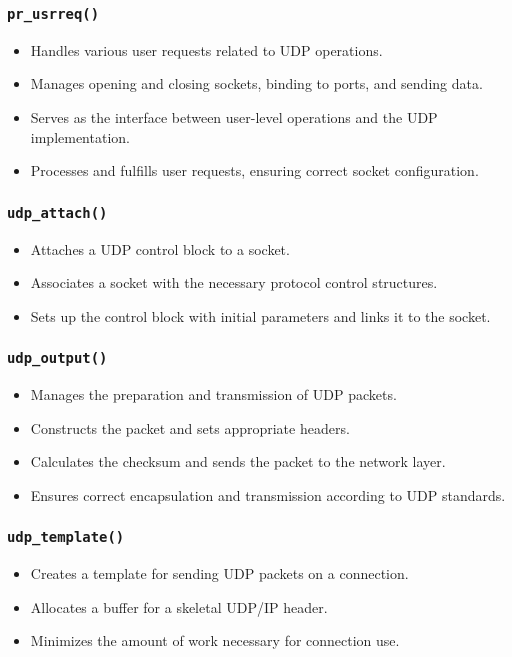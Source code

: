 \subsubsection{\texttt{\large pr\_usrreq()}}
\begin{itemize}
    \item Handles various user requests related to UDP operations.
    \item Manages opening and closing sockets, binding to ports, and sending data.
    \item Serves as the interface between user-level operations and the UDP implementation.
    \item Processes and fulfills user requests, ensuring correct socket configuration.
\end{itemize}

\subsubsection{\texttt{\large udp\_attach()}}
\begin{itemize}
    \item Attaches a UDP control block to a socket.
    \item Associates a socket with the necessary protocol control structures.
    \item Sets up the control block with initial parameters and links it to the socket.
\end{itemize}

\subsubsection{\texttt{\large udp\_output()}}
\begin{itemize}
    \item Manages the preparation and transmission of UDP packets.
    \item Constructs the packet and sets appropriate headers.
    \item Calculates the checksum and sends the packet to the network layer.
    \item Ensures correct encapsulation and transmission according to UDP standards.
\end{itemize}

\subsubsection{\texttt{\large udp\_template()}}
\begin{itemize}
    \item Creates a template for sending UDP packets on a connection.
    \item Allocates a buffer for a skeletal UDP/IP header.
    \item Minimizes the amount of work necessary for connection use.
\end{itemize}

